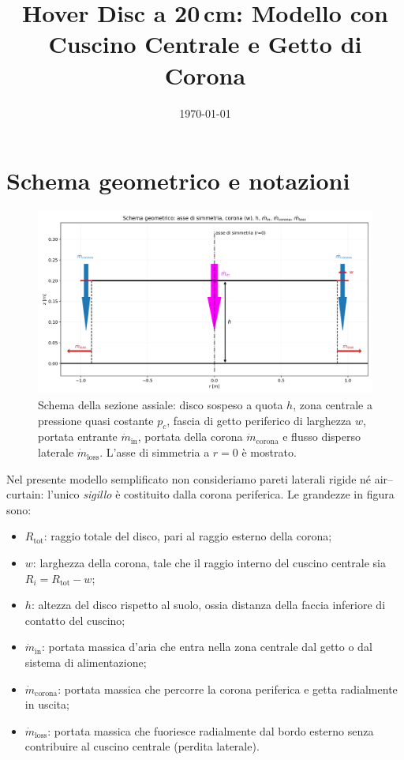 \documentclass[11pt,a4paper]{article}
\title{Hover Disc a 20\,cm: Modello con Cuscino Centrale e Getto di Corona}
\author{}
\date{\today}
\begin{document}
\maketitle

\section{Schema geometrico e notazioni}

\begin{figure}[ht]
  \centering
  \includegraphics[width=0.8\linewidth]{./figures/schema_geometry.png}
  \caption{Schema della sezione assiale: disco sospeso a quota \(h\), zona centrale a pressione quasi costante \texorpdfstring{$p_c$}{pc}, fascia di getto periferico di larghezza \texorpdfstring{$w$}{w}, portata entrante \texorpdfstring{$\dot{m}_{\mathrm{in}}$}{mdot\_in}, portata della corona \texorpdfstring{$\dot{m}_{\mathrm{corona}}$}{mdot\_corona} e flusso disperso laterale \texorpdfstring{$\dot{m}_{\mathrm{loss}}$}{mdot\_loss}. L'asse di simmetria a \texorpdfstring{$r=0$}{r=0} è mostrato.}
  \label{fig:schemageo}
\end{figure}

Nel presente modello semplificato non consideriamo pareti laterali rigide né air--curtain: l'unico \emph{sigillo} è costituito dalla corona periferica. Le grandezze in figura sono:
\begin{itemize}
  \item \(R_{\mathrm{tot}}\): raggio totale del disco, pari al raggio esterno della corona;
  \item \(w\): larghezza della corona, tale che il raggio interno del cuscino centrale sia \(R_i = R_{\mathrm{tot}} - w\);
  \item \(h\): altezza del disco rispetto al suolo, ossia distanza della faccia inferiore di contatto del cuscino;
  \item \(\dot{m}_{\mathrm{in}}\): portata massica d'aria che entra nella zona centrale dal getto o dal sistema di alimentazione;
  \item \(\dot{m}_{\mathrm{corona}}\): portata massica che percorre la corona periferica e getta radialmente in uscita;
  \item \(\dot{m}_{\mathrm{loss}}\): portata massica che fuoriesce radialmente dal bordo esterno senza contribuire al cuscino centrale (perdita laterale).
\end{itemize}
\end{document}
